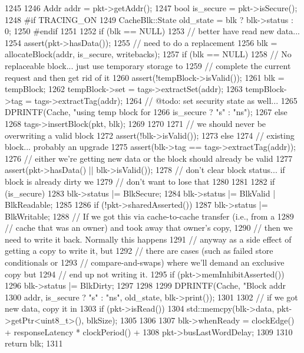 \begin{DoxyCode}
1245 {
1246     Addr addr = pkt->getAddr();
1247     bool is_secure = pkt->isSecure();
1248 #if TRACING_ON
1249     CacheBlk::State old_state = blk ? blk->status : 0;
1250 #endif
1251 
1252     if (blk == NULL) {
1253         // better have read new data...
1254         assert(pkt->hasData());
1255         // need to do a replacement
1256         blk = allocateBlock(addr, is_secure, writebacks);
1257         if (blk == NULL) {
1258             // No replaceable block... just use temporary storage to
1259             // complete the current request and then get rid of it
1260             assert(!tempBlock->isValid());
1261             blk = tempBlock;
1262             tempBlock->set = tags->extractSet(addr);
1263             tempBlock->tag = tags->extractTag(addr);
1264             // @todo: set security state as well...
1265             DPRINTF(Cache, "using temp block for %
1266                     is_secure ? "s" : "ns");
1267         } else {
1268             tags->insertBlock(pkt, blk);
1269         }
1270 
1271         // we should never be overwriting a valid block
1272         assert(!blk->isValid());
1273     } else {
1274         // existing block... probably an upgrade
1275         assert(blk->tag == tags->extractTag(addr));
1276         // either we're getting new data or the block should already be valid
1277         assert(pkt->hasData() || blk->isValid());
1278         // don't clear block status... if block is already dirty we
1279         // don't want to lose that
1280     }
1281 
1282     if (is_secure)
1283         blk->status |= BlkSecure;
1284     blk->status |= BlkValid | BlkReadable;
1285 
1286     if (!pkt->sharedAsserted()) {
1287         blk->status |= BlkWritable;
1288         // If we got this via cache-to-cache transfer (i.e., from a
1289         // cache that was an owner) and took away that owner's copy,
1290         // then we need to write it back.  Normally this happens
1291         // anyway as a side effect of getting a copy to write it, but
1292         // there are cases (such as failed store conditionals or
1293         // compare-and-swaps) where we'll demand an exclusive copy but
1294         // end up not writing it.
1295         if (pkt->memInhibitAsserted())
1296             blk->status |= BlkDirty;
1297     }
1298 
1299     DPRINTF(Cache, "Block addr %
1300             addr, is_secure ? "s" : "ns", old_state, blk->print());
1301 
1302     // if we got new data, copy it in
1303     if (pkt->isRead()) {
1304         std::memcpy(blk->data, pkt->getPtr<uint8_t>(), blkSize);
1305     }
1306 
1307     blk->whenReady = clockEdge() + responseLatency * clockPeriod() +
1308         pkt->busLastWordDelay;
1309 
1310     return blk;
1311 }
\end{DoxyCode}
